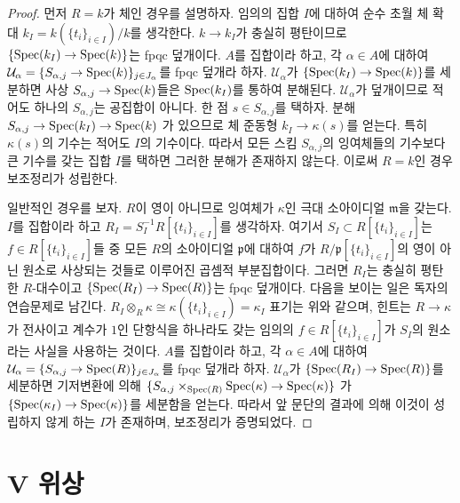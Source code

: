 \begin{proof}
먼저 $R = k$가 체인 경우를 설명하자. 임의의 집합 $I$에 대하여 순수
초월 체 확대 $k_I = k(\{t_i\}_{i \in I})/k$를 생각한다. $k \to k_I$가
충실히 평탄이므로 $\{\mathop{\mathrm{Spec}}(k_I) \to \mathop{\mathrm{Spec}}(k)\}$는 fpqc 덮개이다.
$A$를 집합이라 하고, 각 $\alpha \in A$에 대하여
$\mathcal{U}_\alpha = \{S_{\alpha, j} \to \mathop{\mathrm{Spec}}(k)\}_{j \in J_\alpha}$를
fpqc 덮개라 하자. $\mathcal{U}_\alpha$가
$\{\mathop{\mathrm{Spec}}(k_I) \to \mathop{\mathrm{Spec}}(k)\}$를 세분하면 사상
$S_{\alpha, j} \to \mathop{\mathrm{Spec}}(k)$들은 $\mathop{\mathrm{Spec}}(k_I)$를 통하여 분해된다.
$\mathcal{U}_\alpha$가 덮개이므로 적어도 하나의 $S_{\alpha, j}$는
공집합이 아니다. 한 점 $s \in S_{\alpha, j}$를 택하자. 분해
$S_{\alpha, j} \to \mathop{\mathrm{Spec}}(k_I) \to \mathop{\mathrm{Spec}}(k)$
가 있으므로 체 준동형 $k_I \to \kappa(s)$를 얻는다. 특히
$\kappa(s)$의 기수는 적어도 $I$의 기수이다. 따라서 모든 스킴
$S_{\alpha, j}$의 잉여체들의 기수보다 큰 기수를 갖는 집합 $I$를 택하면
그러한 분해가 존재하지 않는다. 이로써 $R = k$인 경우 보조정리가 성립한다.

\medskip\noindent
일반적인 경우를 보자. $R$이 영이 아니므로 잉여체가 $\kappa$인 극대
소아이디얼 $\mathfrak m$을 갖는다. $I$를 집합이라 하고
$R_I = S_I^{-1} R[\{t_i\}_{i \in I}]$를 생각하자. 여기서
$S_I \subset R[\{t_i\}_{i \in I}]$는 $f \in R[\{t_i\}_{i \in I}]$들
중 모든 $R$의 소아이디얼 $\mathfrak p$에 대하여 $f$가
$R/\mathfrak p[\{t_i\}_{i \in I}]$의 영이 아닌 원소로 사상되는 것들로
이루어진 곱셈적 부분집합이다. 그러면 $R_I$는 충실히 평탄한 $R$-대수이고
$\{\mathop{\mathrm{Spec}}(R_I) \to \mathop{\mathrm{Spec}}(R)\}$는 fpqc 덮개이다. 다음을 보이는 일은
독자의 연습문제로 남긴다.
$R_I \otimes_R \kappa \cong \kappa(\{t_i\}_{i \in I}) = \kappa_I$
표기는 위와 같으며, 힌트는 $R \to \kappa$가 전사이고 계수가 $1$인
단항식을 하나라도 갖는 임의의 $f \in R[\{t_i\}_{i \in I}]$가 $S_I$의
원소라는 사실을 사용하는 것이다. $A$를 집합이라 하고, 각
$\alpha \in A$에 대하여
$\mathcal{U}_\alpha = \{S_{\alpha, j} \to \mathop{\mathrm{Spec}}(R)\}_{j \in J_\alpha}$를
fpqc 덮개라 하자. $\mathcal{U}_\alpha$가
$\{\mathop{\mathrm{Spec}}(R_I) \to \mathop{\mathrm{Spec}}(R)\}$를 세분하면 기저변환에 의해
$\{S_{\alpha, j} \times_{\mathop{\mathrm{Spec}}(R)} \mathop{\mathrm{Spec}}(\kappa) \to \mathop{\mathrm{Spec}}(\kappa)\}$
가 $\{\mathop{\mathrm{Spec}}(\kappa_I) \to \mathop{\mathrm{Spec}}(\kappa)\}$를 세분함을 얻는다. 따라서
앞 문단의 결과에 의해 이것이 성립하지 않게 하는 $I$가 존재하며,
보조정리가 증명되었다.
\end{proof}












\section{V 위상}
\label{section-V}


